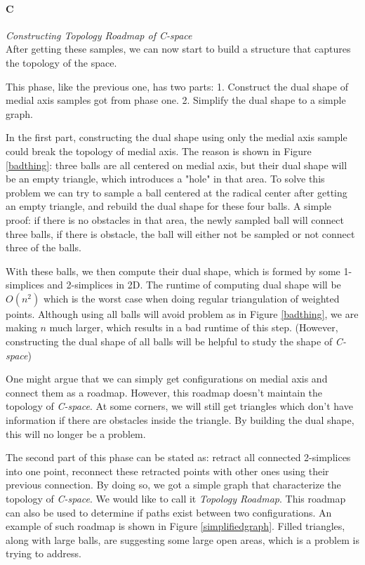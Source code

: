 \documentclass[11pt]{article}
\begin{document}

\paragraph{C} \emph{Constructing Topology Roadmap of C-space} \hfill \\
\indent After getting these samples, we can now start to build a structure that captures the topology of the space. 

\indent This phase, like the previous one, has two parts: 1. Construct the dual shape of medial axis samples got from phase one. 2. Simplify the dual shape to a simple graph.

\indent In the first part, constructing the dual shape using only the medial axis sample could break the topology of medial axis. The reason is shown in Figure \ref{badthing}: three balls are all centered on medial axis, but their dual shape will be an empty triangle, which introduces a "hole" in that area. To solve this problem we can try to sample a ball centered at the radical center after getting an empty triangle, and rebuild the dual shape for these four balls\cite{radical center}. A simple proof: if there is no obstacles in that area, the newly sampled ball will connect three balls, if there is obstacle, the ball will either not be sampled or not connect three of the balls.

\indent With these balls, we then compute their dual shape, which is formed by some 1-simplices and 2-simplices in 2D. The runtime of computing dual shape will be $O(n^2)$ which is the worst case when doing regular triangulation of weighted points. Although using all balls will avoid problem as in Figure \ref{badthing}, we are making $n$ much larger, which results in a bad runtime of this step. (However, constructing the dual shape of all balls will be helpful to study the shape of \emph{C-space})

\indent One might argue that we can simply get configurations on medial axis and connect them as a roadmap. However, this roadmap doesn't maintain the topology of \emph{C-space}. At some corners, we will still get triangles which don't have information if there are obstacles inside the triangle. By building the dual shape, this will no longer be a problem. 

\indent The second part of this phase can be stated as: retract all connected 2-simplices into one point, reconnect these retracted points with other ones using their previous connection. By doing so, we got a simple graph that characterize the topology of \emph{C-space}. We would like to call it \emph{Topology Roadmap}. This roadmap can also be used to determine if paths exist between two configurations. An example of such roadmap is shown in Figure \ref{simplifiedgraph}. Filled triangles, along with large balls, are suggesting some large open areas, which is a problem \cite{largeconvex} is trying to address. 
\end{document}
